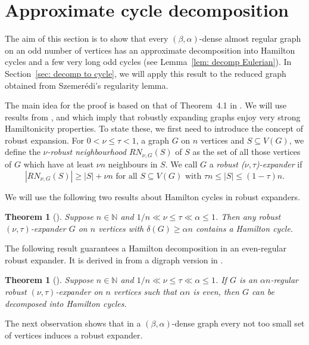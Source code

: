 \documentclass[a4paper, 11pt, reqno]{amsart}
\newtheorem{theorem}[definition]{Theorem}
\numberwithin{equation}{section}
\newcommand{\1}{{\rm 1\hspace*{-0.4ex}%
\rule{0.1ex}{1.52ex}\hspace*{0.2ex}}}
\newcommand{\N}{\mathbb N}
\begin{document}
\section{Approximate cycle decomposition}
\label{sec: approx cycle decomp}
The aim of this section is to show that every $(\beta,\alpha)$-dense almost regular graph on an odd number of vertices
has an approximate decomposition into Hamilton cycles and a few very long odd cycles (see Lemma~\ref{lem: decomp Eulerian}). 
In Section~\ref{sec: decomp to cycle}, we will apply this result to the reduced graph obtained from Szemer\'{e}di's regularity lemma.

The main idea for the proof is based on that of Theorem~4.1 in \cite{GKO16}.
We will use results from \cite{KO13},\cite{KO14} and \cite{KOT10} which imply that robustly expanding graphs enjoy very strong Hamiltonicity properties. To state these, we first need to introduce the concept of robust expansion. For $0<\nu\leq \tau<1$, a graph $G$ on $n$ vertices and $S\subseteq V(G)$, 
we define the {\em $\nu$-robust neighbourhood $RN_{\nu,G}(S)$} of $S$ 
as the set of all those vertices of $G$ which have at least $\nu n$ neighbours in $S$. 
We call $G$ a {\em robust ($\nu,\tau$)-expander} if
$$ |RN_{\nu,G}(S)| \geq |S|+\nu n \text{ for all } S\subseteq V(G) \text{ with } \tau n \leq |S| \leq (1-\tau) n. $$

We will use the following two results about Hamilton cycles in robust expanders.

\begin{theorem}[\cite{KOT10}]\label{thm: expander ham}
Suppose $n\in \N$ and $1/n \ll \nu \leq \tau \ll \alpha \leq 1$. 
Then any robust $(\nu,\tau)$-expander $G$ on $n$ vertices with $\delta(G)\geq \alpha n$ contains a Hamilton cycle.
\end{theorem}
The following result guarantees a Hamilton decomposition in an even-regular robust expander. It is derived in \cite{KO14} from a digraph version in \cite{KO13}.
\begin{theorem}[\cite{KO13, KO14}]\label{thm: decomp regular}
Suppose $n\in \N$ and $1/n\ll \nu\leq \tau \ll \alpha\leq 1$.
If $G$ is an $\alpha n$-regular robust $(\nu,\tau)$-expander on $n$ vertices such that $\alpha n$ is even,
then $G$ can be decomposed into Hamilton cycles.
\end{theorem}


The next observation shows that in a $(\beta,\alpha)$-dense graph
every not too small set of vertices induces a robust expander.
\end{document}

